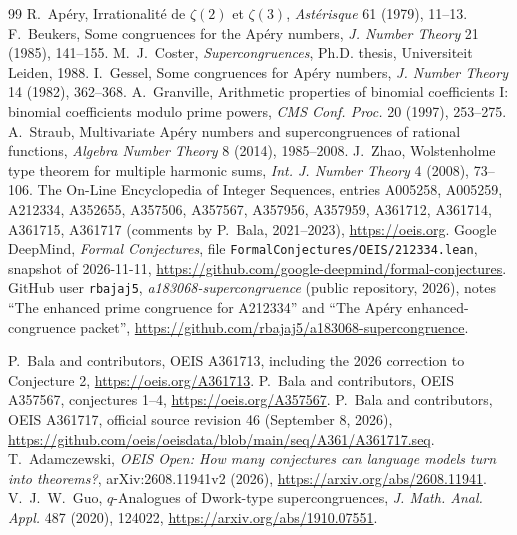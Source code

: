 \documentclass[11pt]{amsart}
\theoremstyle{definition}
\theoremstyle{remark}
\begin{document}
\begin{thebibliography}{99}
 R.~Ap\'ery, Irrationalit\'e de $\zeta(2)$ et $\zeta(3)$, \emph{Ast\'erisque} 61 (1979), 11--13.
 F.~Beukers, Some congruences for the Ap\'ery numbers, \emph{J. Number Theory} 21 (1985), 141--155.
 M.~J.~Coster, \emph{Supercongruences}, Ph.D. thesis, Universiteit Leiden, 1988.
 I.~Gessel, Some congruences for Ap\'ery numbers, \emph{J. Number Theory} 14 (1982), 362--368.
 A.~Granville, Arithmetic properties of binomial coefficients I: binomial coefficients modulo prime powers, \emph{CMS Conf. Proc.} 20 (1997), 253--275.
 A.~Straub, Multivariate Ap\'ery numbers and supercongruences of rational functions, \emph{Algebra Number Theory} 8 (2014), 1985--2008.
 J.~Zhao, Wolstenholme type theorem for multiple harmonic sums, \emph{Int. J. Number Theory} 4 (2008), 73--106.
 The On-Line Encyclopedia of Integer Sequences, entries A005258, A005259, A212334, A352655, A357506, A357567, A357956, A357959, A361712, A361714, A361715, A361717 (comments by P.~Bala, 2021--2023), \url{https://oeis.org}.
 Google DeepMind, \emph{Formal Conjectures}, file \texttt{FormalConjectures/OEIS/212334.lean}, snapshot of 2026-11-11, \url{https://github.com/google-deepmind/formal-conjectures}.
 GitHub user \texttt{rbajaj5}, \emph{a183068-supercongruence} (public repository, 2026), notes ``The enhanced prime congruence for A212334'' and ``The Ap\'ery enhanced-congruence packet'', \url{https://github.com/rbajaj5/a183068-supercongruence}.

 P.~Bala and contributors, OEIS A361713, including the
2026 correction to Conjecture 2, \url{https://oeis.org/A361713}.
 P.~Bala and contributors, OEIS A357567, conjectures 1--4,
\url{https://oeis.org/A357567}.
 P.~Bala and contributors, OEIS A361717, official source
revision 46 (September 8, 2026),
\url{https://github.com/oeis/oeisdata/blob/main/seq/A361/A361717.seq}.
 T.~Adamczewski, \emph{OEIS Open: How many conjectures can
language models turn into theorems?}, arXiv:2608.11941v2 (2026),
\url{https://arxiv.org/abs/2608.11941}.
 V.~J.~W.~Guo, $q$-Analogues of Dwork-type supercongruences,
\emph{J. Math. Anal. Appl.} 487 (2020), 124022,
\url{https://arxiv.org/abs/1910.07551}.

\end{thebibliography}
\end{document}
